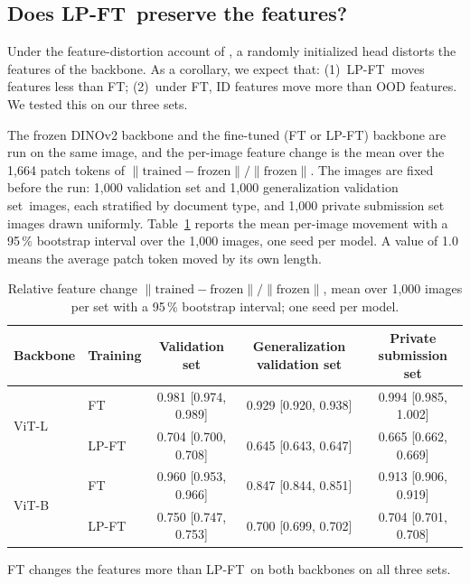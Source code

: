 \documentclass[10pt]{article}
\newcommand{\ci}[2]{{\footnotesize[#1, #2]}}
\newcommand{\lpft}{LP-FT}
\newcommand{\genval}{generalization validation set}
\newcommand{\Genval}{Generalization validation set}
\begin{document}
\subsection{Does \lpft\ preserve the features?}
\label{sec:features}
Under the feature-distortion account of \citet{kumar2022finetuning}, a randomly initialized head distorts the features of the backbone. As a corollary, we expect that: (1)~\lpft\ moves features less than FT; (2)~under FT, ID features move more than OOD features. We tested this on our three sets.

The frozen DINOv2 backbone and the fine-tuned (FT or \lpft) backbone are run on the same image, and the per-image feature change is the mean over the 1,664 patch tokens of $\lVert \mathrm{trained} - \mathrm{frozen} \rVert / \lVert \mathrm{frozen} \rVert$. The images are fixed before the run: 1,000 validation set and 1,000 \genval\ images, each stratified by document type, and 1,000 private submission set images drawn uniformly. Table~\ref{tab:features} reports the mean per-image movement with a 95\,\% bootstrap interval over the 1,000 images, one seed per model. A value of 1.0 means the average patch token moved by its own length.

\begin{table}[t]
  \caption{Relative feature change $\lVert \mathrm{trained} - \mathrm{frozen} \rVert / \lVert \mathrm{frozen} \rVert$, mean over 1,000 images per set with a 95\,\% bootstrap interval; one seed per model.}
  \label{tab:features}
  \centering
  \small
  \begin{tabular}{@{}llccc@{}}
    \toprule
    Backbone & Training & Validation set & \Genval & Private submission set \\
    \midrule
    \multirow{2}{*}{ViT-L} & FT    & 0.981 \ci{0.974}{0.989} & 0.929 \ci{0.920}{0.938} & 0.994 \ci{0.985}{1.002} \\
                           & \lpft & 0.704 \ci{0.700}{0.708} & 0.645 \ci{0.643}{0.647} & 0.665 \ci{0.662}{0.669} \\
    \midrule
    \multirow{2}{*}{ViT-B} & FT    & 0.960 \ci{0.953}{0.966} & 0.847 \ci{0.844}{0.851} & 0.913 \ci{0.906}{0.919} \\
                           & \lpft & 0.750 \ci{0.747}{0.753} & 0.700 \ci{0.699}{0.702} & 0.704 \ci{0.701}{0.708} \\
    \bottomrule
  \end{tabular}
\end{table}

FT changes the features more than \lpft\ on both backbones on all three sets.
\end{document}
